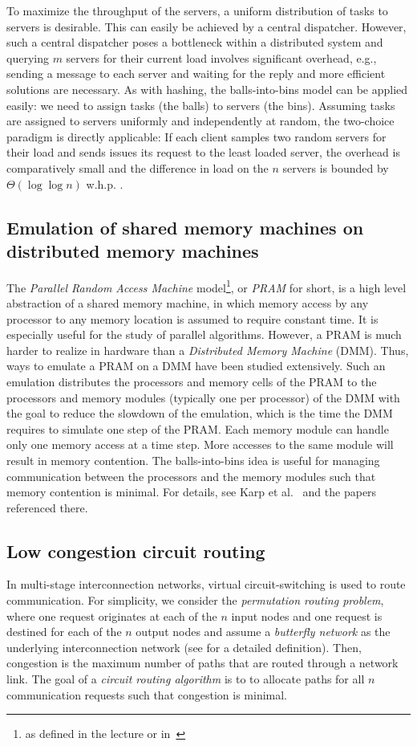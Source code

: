\documentclass[a4paper,12pt]{article}
\begin{document}
To maximize the throughput of the servers, a uniform distribution of tasks to servers is desirable. This can easily be achieved by a central dispatcher. However, such a central dispatcher poses a bottleneck within a distributed system and querying $m$ servers for their current load involves significant overhead, e.g., sending a message to each server and waiting for the reply and more efficient solutions are necessary. As with hashing, the balls-into-bins model can be applied easily: we need to assign tasks (the balls) to servers (the bins). Assuming tasks are assigned to servers uniformly and independently at random, the two-choice paradigm is directly applicable: If each client samples two random servers for their load and sends issues its request to the least loaded server, the overhead is comparatively small and the difference in load on the $n$ servers is bounded by $\Theta\left(\log \log n\right)$ w.h.p. \cite{KLM92} \cite{RS98} \cite{MRS01}.  

\subsection{Emulation of shared memory machines on distributed memory machines}
\label{sec:DMM}
The \emph{Parallel Random Access Machine} model\footnote{as defined in the lecture or in~\cite{P03}}, or \emph{PRAM} for short, is a high level abstraction of a shared memory machine, in which memory access by any processor to any memory location is assumed to require constant time. It is especially useful for the study of parallel algorithms. However, a PRAM is much harder to realize in hardware than a \emph{Distributed Memory Machine} (DMM). Thus, ways to emulate a PRAM on a DMM have been studied extensively. Such an emulation distributes the processors and memory cells of the PRAM to the processors and memory modules (typically one per processor) of the DMM with the goal to reduce the slowdown of the emulation, which is the time the DMM requires to simulate one step of the PRAM. Each memory module can handle only one memory access at a time step. More accesses to the same module will result in memory contention. The balls-into-bins idea is useful for managing communication between the processors and the memory modules such that memory contention is minimal. For details, see Karp et al.~\cite{KLM92} and the papers referenced there. 
 
\subsection{Low congestion circuit routing}
\label{sec:circuitrouting}
In multi-stage interconnection networks, virtual circuit-switching is used to route communication. For simplicity, we consider the \emph{permutation routing problem}, where one request originates at each of the $n$ input nodes and one request is destined for each of the $n$ output nodes and assume a \emph{butterfly network} as the underlying interconnection network (see \cite{CLR09} for a detailed definition). Then, congestion is the maximum number of paths that are routed through a network link. The goal of a \emph{circuit routing algorithm} is to to allocate paths for all $n$ communication requests such that congestion is minimal.
\end{document}
